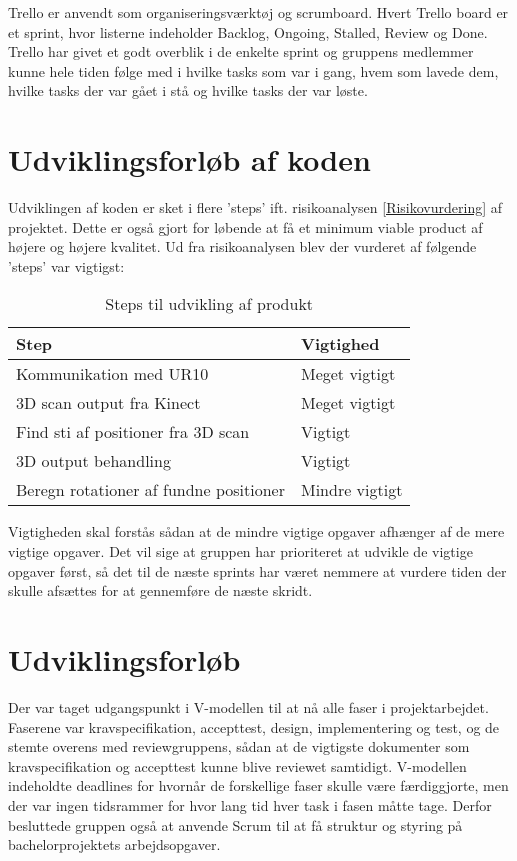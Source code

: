 Trello er anvendt som organiseringsværktøj og scrumboard. Hvert Trello board er et sprint, hvor listerne indeholder Backlog, Ongoing, Stalled, Review og Done. Trello har givet et godt overblik i de enkelte sprint og gruppens medlemmer kunne hele tiden følge med i hvilke tasks som var i gang, hvem som lavede dem, hvilke tasks der var gået i stå og hvilke tasks der var løste. 

\section{Udviklingsforløb af koden}
Udviklingen af koden er sket i flere 'steps' ift. risikoanalysen \ref{Risikovurdering} af projektet. Dette er også gjort for løbende at få et minimum viable product af højere og højere kvalitet. 
Ud fra risikoanalysen blev der vurderet af følgende 'steps' var vigtigst:

\begin{table}[h]
\centering
\begin{tabular}{|l| p{}|}
\hline
\textbf{Step} &  \textbf{Vigtighed} \\\hline
	Kommunikation med UR10 & Meget vigtigt \\\hline
	3D scan output fra Kinect & Meget vigtigt\\\hline
	Find sti af positioner fra 3D scan & Vigtigt \\\hline
	3D output behandling & Vigtigt \\\hline
	Beregn rotationer af fundne positioner & Mindre vigtigt \\\hline
\end{tabular}
\caption{Steps til udvikling af produkt}
\end{table}

Vigtigheden skal forstås sådan at de mindre vigtige opgaver afhænger af de mere vigtige opgaver. 
Det vil sige at gruppen har prioriteret at udvikle de vigtige opgaver først, så det til de næste sprints har været nemmere at vurdere tiden der skulle afsættes for at gennemføre de næste skridt.

\section{Udviklingsforløb}
Der var taget udgangspunkt i V-modellen til at nå alle faser i projektarbejdet. Faserene var kravspecifikation, accepttest, design, implementering og test, og de stemte overens med reviewgruppens, sådan at de vigtigste dokumenter som kravspecifikation og accepttest kunne blive reviewet samtidigt. V-modellen indeholdte deadlines for hvornår de forskellige faser skulle være færdiggjorte, men der var ingen tidsrammer for hvor lang tid hver task i fasen måtte tage. Derfor besluttede gruppen også at anvende Scrum til at få struktur og styring på bachelorprojektets arbejdsopgaver.

